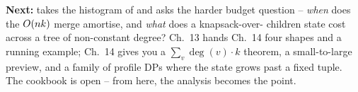 \begin{lastword}
\medskip
\textbf{Next:}  takes the histogram of 
and asks the harder budget question -- \emph{when} does the
$O(nk)$ merge amortise, and \emph{what} does a knapsack-over-
children state cost across a tree of non-constant degree? Ch.~13 hands
Ch.~14 four shapes and a running example; Ch.~14 gives you a
$\sum_v \deg(v) \cdot k$ theorem, a small-to-large preview, and a
family of profile DPs where the state grows past a fixed tuple. The
cookbook is open -- from here, the analysis becomes the point.
\end{lastword}
